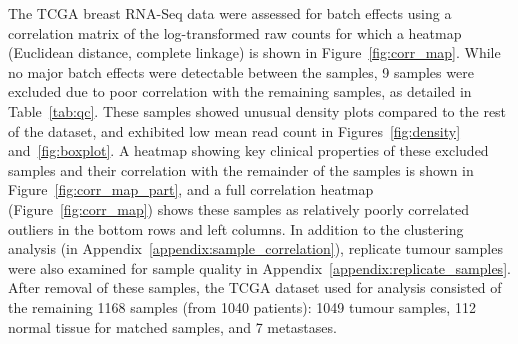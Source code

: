 The \gls{TCGA} breast RNA-Seq data were assessed for batch effects using a correlation matrix of the log-transformed raw counts for which a heatmap (Euclidean distance, complete linkage) is shown in Figure~\ref{fig:corr_map}. While no major batch effects were detectable between the samples, 9 samples were excluded due to poor correlation with the remaining samples, as detailed in Table~\ref{tab:qc}. These samples showed unusual density plots compared to the rest of the dataset, and exhibited low mean read count in Figures~\ref{fig:density} and~\ref{fig:boxplot}. A heatmap showing key clinical properties of these excluded samples and their correlation with the remainder of the samples is shown in Figure~\ref{fig:corr_map_part}, and a full correlation heatmap (Figure~\ref{fig:corr_map}) shows these samples as relatively poorly correlated outliers in the bottom rows and left columns.
In addition to the clustering analysis (in Appendix~\ref{appendix:sample_correlation}), replicate tumour samples were also examined for sample quality in Appendix~\ref{appendix:replicate_samples}.
After removal of these samples, the \gls{TCGA} dataset used for analysis consisted of the remaining 1168 samples (from 1040 patients): 1049 tumour samples, 112 normal tissue for matched samples, and 7 metastases.


